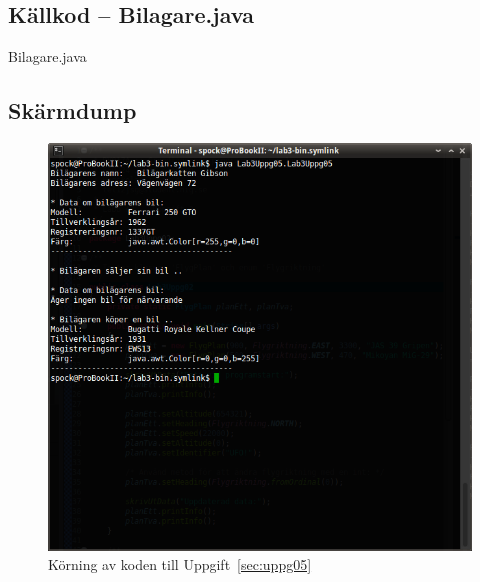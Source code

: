 \subsection{Källkod -- Bilagare.java}
\caption{Bilagare.java}
\label{src:bilagare}

\subsection{Skärmdump}
\begin{figure}[htbp]
    \centering
        \includegraphics[width=\linewidth]{img/05.png}
    \caption{Körning av koden till Uppgift~\ref{sec:uppg05}}
    \label{fig:uppg05-screenshot}
\end{figure}

